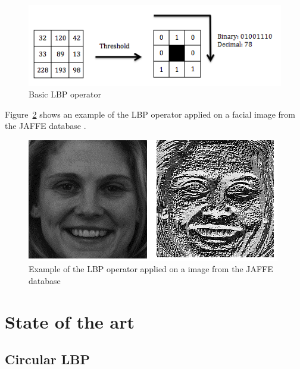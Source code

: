 \begin{figure}[!h]
\begin{center}
\noindent \includegraphics[scale=1]{figures/lbp_basic_operator} 
\newline
\caption{Basic LBP operator}
\label{lbp_basic_operator}
\end{center} 
\end{figure}

\noindent Figure~\ref{lbp_basic_operator_example} shows an example of the LBP operator applied on a facial image from the JAFFE database \cite{LIU11}.
\newline

\begin{figure}[!h]
\begin{center}
\noindent \includegraphics[scale=0.7]{figures/lbp_basic_operator_example} 
\newline
\caption{Example of the LBP operator applied on a image from the JAFFE database}
\label{lbp_basic_operator_example}
\end{center} 
\end{figure}

\section{State of the art}

\subsection{Circular LBP}

